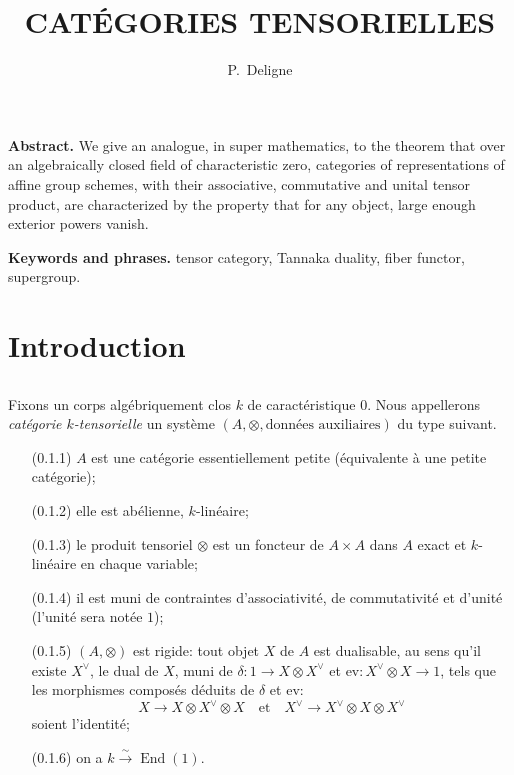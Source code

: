 \documentclass[11pt,a4paper]{article}
\title{\textbf{CAT\'EGORIES TENSORIELLES}}
\author{P.~Deligne}
\date{}
\theoremstyle{plain}
\theoremstyle{definition}
\DeclareMathOperator{\End}{End}
\newcommand{\ev}{\mathrm{ev}}
\begin{document}
\maketitle

\noindent\textbf{Abstract.}
We give an analogue, in super mathematics, to the theorem that over an algebraically closed field of characteristic zero, categories of representations of affine group schemes, with their associative, commutative and unital tensor product, are characterized by the property that for any object, large enough exterior powers vanish.

\smallskip
\noindent\textbf{Keywords and phrases.} tensor category, Tannaka duality, fiber functor, supergroup.

\tableofcontents
\section{Introduction}

\subsection{}
\label{0.1}

Fixons un corps alg\'ebriquement clos $k$ de caract\'eristique $0$. Nous appellerons \emph{cat\'egorie $k$-tensorielle} un syst\`eme $(A,\otimes,\text{donn\'ees auxiliaires})$ du type suivant.

\begin{itemize}
\item[(0.1.1)] $A$ est une cat\'egorie essentiellement petite (\'equivalente \`a une petite cat\'egorie);
\item[(0.1.2)] elle est ab\'elienne, $k$-lin\'eaire;
\item[(0.1.3)] le produit tensoriel $\otimes$ est un foncteur de $A\times A$ dans $A$ exact et $k$-lin\'eaire en chaque variable;
\item[(0.1.4)] il est muni de contraintes d'associativit\'e, de commutativit\'e et d'unit\'e (l'unit\'e sera not\'ee $1$);
\item[(0.1.5)] $(A,\otimes)$ est rigide: tout objet $X$ de $A$ est dualisable, au sens qu'il existe $X^\vee$, le dual de $X$, muni de $\delta:1\to X\otimes X^\vee$ et $\ev:X^\vee\otimes X\to 1$, tels que les morphismes compos\'es d\'eduits de $\delta$ et $\ev$:
\[
X\to X\otimes X^\vee\otimes X\quad\text{et}\quad X^\vee\to X^\vee\otimes X\otimes X^\vee
\]
soient l'identit\'e;
\item[(0.1.6)] on a $k\xrightarrow{\sim}\End(1)$.
\end{itemize}
\end{document}
